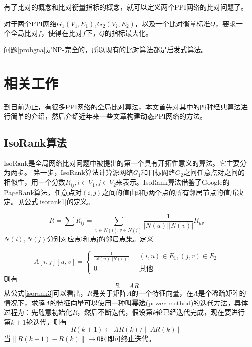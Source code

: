 有了比对的概念和比对衡量指标的概念，就可以定义两个PPI网络的比对问题了。

\begin{prob}[PPI网络比对问题]
\label{probgna}
对于两个PPI网络$G_1(V_1,E_1),G_2(V_2,E_2)$，以及一个比对衡量标准$Q$，要求一个全局比对$f$，使得在比对$f$下，$Q$的指标最大化。
\end{prob}

问题\ref{probgna}是NP-完全的，所以现有的比对算法都是启发式算法。

\section{相关工作}
到目前为止，有很多PPI网络的全局比对算法，本文首先对其中的四种经典算法进行简单的介绍，然后介绍近年来一些文章构建动态PPI网络的方法。
\subsection{IsoRank算法}
IsoRank是全局网络比对问题中被提出的第一个具有开拓性意义的算法。它主要分为两步。
第一步，IsoRank算法计算源网络$G_1$和目标网络$G_2$之间任意点对之间的相似性，用一个分数$R_{ij},i\in V_1,j\in V_2$来表示。IsoRank算法借鉴了Google的PageRank算法，任意点对$(i,j)$之间的值由$i$和$j$两个点的所有邻居节点的值所决定。见公式\ref{isorank1}的定义。

\begin{equation}\label{isorank1}
R=\sum R_{ij}=\sum_{u\in N(i),v\in N(j)}\frac{1}{\left | N(u) \right |\left | N(v) \right |}R_{uv}
\end{equation}
$N(i),N(j)$分别对应点i和点j的邻居点集。定义

\begin{equation}\label{isorank2}
A[i,j][u,v]=\begin{cases}
\frac{1}{\left | N(u) \right |\left | N(v) \right |} & \text{  } (i,u)\in E_1, (j,v)\in E_2 \\ 
 0& \text{  } \text{其他}
\end{cases}
\end{equation}
则有
\begin{equation}\label{isorank3}
R=AR
\end{equation}
从公式\ref{isorank3}可以看出，$R$是关于矩阵$A$的一个特征向量，在$A$是个稀疏矩阵的情况下，求解$A$的特征向量可以使用一种叫\textbf{幂法}(power method)的迭代方法，具体过程为：先随意初始化$R$，然后不断迭代，假设第$k$轮已经迭代完成，现在要进行第$k+1$轮迭代，则有
\begin{equation}\label{isorank4}
R(k+1)\leftarrow AR(k)/\left \|AR(k)\right \|
\end{equation}
当$\left \|R(k+1)-R(k)\right \|\rightarrow 0$时即可终止迭代。

